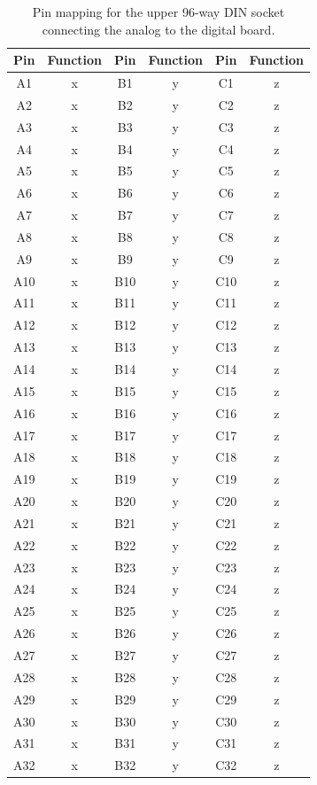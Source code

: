 \documentclass[a4paper]{article}
\begin{document}
\begin{table}[h]
    \begin{center}
        \caption{Pin mapping for the upper 96-way DIN socket connecting the analog to the digital board.}
        \label{tab:DIN96Upper}
        \begin{tabular}{cc|cc|cc}
            \hline
            \hline
            Pin & Function & Pin & Function & Pin & Function \\
            \hline
            A1 & x & B1 & y & C1 & z \\
            A2 & x & B2 & y & C2 & z \\
            A3 & x & B3 & y & C3 & z \\
            A4 & x & B4 & y & C4 & z \\
            A5 & x & B5 & y & C5 & z \\
            A6 & x & B6 & y & C6 & z \\
            A7 & x & B7 & y & C7 & z \\
            A8 & x & B8 & y & C8 & z \\
            A9 & x & B9 & y & C9 & z \\
            A10 & x & B10 & y & C10 & z \\
            A11 & x & B11 & y & C11 & z \\
            A12 & x & B12 & y & C12 & z \\
            A13 & x & B13 & y & C13 & z \\
            A14 & x & B14 & y & C14 & z \\
            A15 & x & B15 & y & C15 & z \\
            A16 & x & B16 & y & C16 & z \\
            A17 & x & B17 & y & C17 & z \\
            A18 & x & B18 & y & C18 & z \\
            A19 & x & B19 & y & C19 & z \\
            A20 & x & B20 & y & C20 & z \\
            A21 & x & B21 & y & C21 & z \\
            A22 & x & B22 & y & C22 & z \\
            A23 & x & B23 & y & C23 & z \\
            A24 & x & B24 & y & C24 & z \\
            A25 & x & B25 & y & C25 & z \\
            A26 & x & B26 & y & C26 & z \\
            A27 & x & B27 & y & C27 & z \\
            A28 & x & B28 & y & C28 & z \\
            A29 & x & B29 & y & C29 & z \\
            A30 & x & B30 & y & C30 & z \\
            A31 & x & B31 & y & C31 & z \\
            A32 & x & B32 & y & C32 & z \\
            \hline
            \hline
        \end{tabular}
    \end{center}
\end{table}
\end{document}

